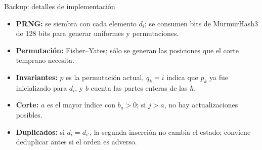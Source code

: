 \documentclass[aspectratio=169,11pt]{beamer}
\begin{document}
\begin{frame}{Backup: detalles de implementaci\'on}
  \begin{itemize}
    \item \textbf{PRNG:} se siembra con cada elemento $d_i$; se consumen bits
          de MurmurHash3 de 128 bits para generar uniformes y permutaciones.
    \item \textbf{Permutaci\'on:} Fisher--Yates; s\'olo se generan las
          posiciones que el corte temprano necesita.
    \item \textbf{Invariantes:} $p$ es la permutaci\'on actual, $q_k=i$
          indica que $p_k$ ya fue inicializado para $d_i$, y $b$ cuenta las
          partes enteras de las $h$.
    \item \textbf{Corte:} $a$ es el mayor \'indice con $b_a>0$; si
          $j>a$, no hay actualizaciones posibles.
    \item \textbf{Duplicados:} si $d_i=d_{i'}$, la segunda inserci\'on no
          cambia el estado; conviene deduplicar antes si el orden es adverso.
  \end{itemize}
\end{frame}
\end{document}
